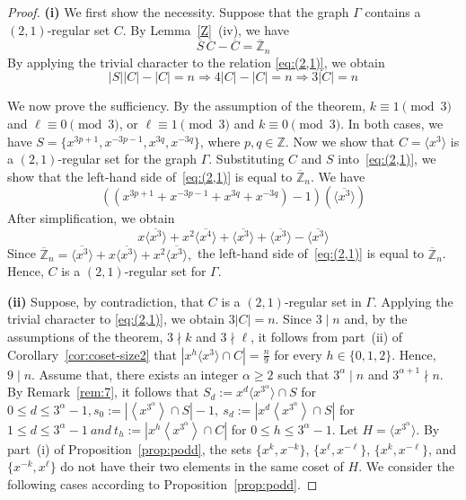 \documentclass[12pt]{article}
\begin{document}
 \begin{proof}
\textbf{(i)} We first show the necessity. Suppose that the graph $\Gamma$ contains a $(2,1)$-regular set $C$. By Lemma~\ref{Z}~(iv), we have
\begin{equation}\label{eq:(2,1)}
	\overline{S}\,\overline{C}-\overline{C}
	=\overline{\mathbb{Z}}_{n}
\end{equation}
By applying the trivial character to the relation \eqref{eq:(2,1)}, we obtain
\[
|S||C|-|C|=n \Longrightarrow  4|C|-|C|=n \Longrightarrow 3|C|=n
\]

 We now prove the sufficiency. By the assumption of the theorem,
 \(k\equiv 1 \pmod{3}\) and \(\ell\equiv 0 \pmod{3}\), or \(\ell\equiv 1 \pmod{3}\) and \(k\equiv 0 \pmod{3}\). In both cases, we have $S=\{x^{3p+1},x^{-3p-1},x^{3q},x^{-3q}\}$, where \(p,q\in\mathbb{Z}\).
 Now we show that
$C=\langle x^{3}\rangle$
is a $(2,1)$-regular set for the graph $\Gamma$.
Substituting $C$ and $S$ into~\eqref{eq:(2,1)}, we show that the left-hand side of~\eqref{eq:(2,1)} is equal to $\overline{\mathbb{Z}}_{n}$. We have
\[
\left(\left(x^{3p+1}+x^{-3p-1}+x^{3q}+x^{-3q}\right)-1\right)
\left(\overline{\langle x^{3}\rangle}\right)
\]
After simplification, we obtain
\[
x\overline{\langle x^{3}\rangle}
+x^{2}\overline{\langle x^{4}\rangle}
+\overline{\langle x^{3}\rangle}
+\overline{\langle x^{3}\rangle}
-\overline{\langle x^{3}\rangle}
\]
Since
$
\overline{\mathbb{Z}}_{n}
=
\overline{\langle x^{3}\rangle}
+x\overline{\langle x^{3}\rangle}
+x^{2}\overline{\langle x^{3}\rangle},
$
the left-hand side of~\eqref{eq:(2,1)} is equal to
$\overline{\mathbb{Z}}_{n}$.
Hence, $C$ is a $(2,1)$-regular set for $\Gamma$.

\textbf{(ii)} Suppose, by contradiction, that \(C\) is a \((2,1)\)-regular set in \(\Gamma\). Applying the trivial character to \eqref{eq:(2,1)}, we obtain \(3|C|=n\). Since \(3\mid n\) and, by the assumptions of the theorem, \(3\nmid k\) and \(3\nmid \ell\), it follows from part~(ii) of Corollary~\ref{cor:coset-size2} that \(\left|x^{h}\langle x^{3}\rangle\cap C\right|=\frac{n}{9}\) for every \(h\in\{0,1,2\}\). Hence, \(9\mid n\). Assume that, there exists an integer \(\alpha\ge 2\) such that
$
3^{\alpha}\mid n$
and
$3^{\alpha+1}\nmid n.$ By Remark~\ref{rem:7}, it follows that $ S_d := x^d \langle x^{3^{\alpha}} \rangle \cap S$ for $0 \le d \le 3^{\alpha}-1, s_0:=\left|\left\langle x^{3^{\alpha}}\right\rangle\cap S\right|-1,\ 	s_d:=\left|x^d\left\langle x^{3^{\alpha}}\right\rangle\cap S\right|$ for $1\le d\le 3^{\alpha}-1\ and\ t_h:=\left|x^h\left\langle x^{3^{\alpha}}\right\rangle\cap C\right|$ for $0\le h\le 3^{\alpha}-1.$ Let
$
H=\langle x^{3^{\alpha}}\rangle.
$ By part~(i) of Proposition~\ref{prop:podd}, the sets $\{x^k,x^{-k}\}$, $\{x^\ell,x^{-\ell}\}$, $\{x^k,x^{-\ell}\}$, and $\{x^{-k},x^{\ell}\}$ do not have their two elements in the same coset of $H$. We consider the following cases according to Proposition~\ref{prop:podd}.



\end{proof}
\end{document}
